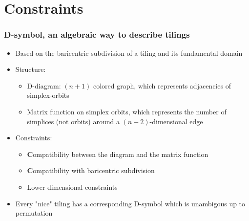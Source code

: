 \section{Constraints}
\begin{frame}
  \frametitle{D-symbol, an algebraic way to describe tilings}
  \begin{itemize}
    \item Based on the baricentric subdivision of a tiling and its fundamental
      domain 
    \item Structure:
      \begin{itemize}
        \item D-diagram: $(n+1)$ colored graph, which represents adjacencies of
          simplex-orbits
        \item Matrix function on simplex orbits, which represents the number of
          simplices (not orbits) around a $(n-2)$-dimensional edge
      \end{itemize}
    \item Constraints:
      \begin{itemize}
        \item {\textbf Compatibility between the diagram and the matrix
	  function}
	\item {\textbf Compatibility with baricentric subdivision}
        \item Lower dimensional constraints
      \end{itemize}
    \item Every "nice" tiling has a corresponding D-symbol which is unambigous
      up to permutation 
  \end{itemize}
\end{frame}

